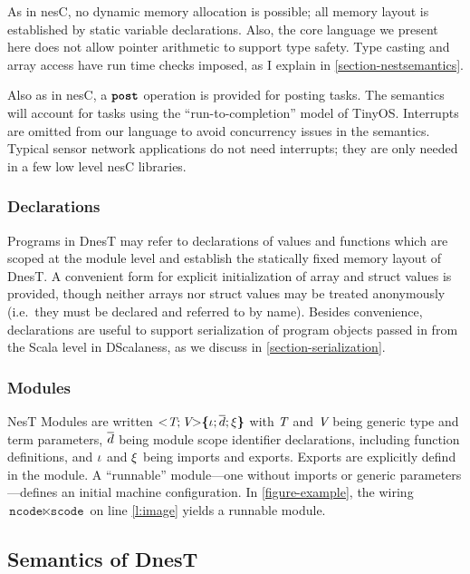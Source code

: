 As in nesC, no dynamic memory allocation is possible; all memory layout is established by static
variable declarations. Also, the core language we present here does not allow pointer arithmetic
to support type safety. Type casting and array access have run time checks imposed, as I explain
in \autoref{section-nestsemantics}.

Also as in nesC, a $\mbox{\bf \texttt{post}}$ operation is provided for posting tasks. The semantics will account
for tasks using the ``run-to-completion'' model of TinyOS. Interrupts are omitted from our
language to avoid concurrency issues in the semantics. Typical sensor network applications do
not need interrupts; they are only needed in a few low level nesC libraries.

\subsubsection{Declarations}

Programs in DnesT may refer to declarations of values and functions which are scoped at the
module level and establish the statically fixed memory layout of DnesT. A convenient form for
explicit initialization of array and struct values is provided, though neither arrays nor struct
values may be treated anonymously (i.e.~they must be declared and referred to by name). Besides
convenience, declarations are useful to support serialization of program objects passed in from
the Scala level in DScalaness, as we discuss in \autoref{section-serialization}.

\subsubsection{Modules}

NesT Modules are written $\mathrm{<}\textit{T}; \textit{V}\mathrm{>}\textup{\textbf{\{}} \iota; \overline{d}; \xi \textup{\textbf{\}}} $ with
$\textit{T}$ and $\textit{V}$ being generic type and term parameters, $\overline{d}$ being module scope
identifier declarations, including function definitions, and $\iota$ and $\xi$ being
imports and exports. Exports are explicitly defind in the module. A ``runnable'' module---one
without imports or generic parameters---defines an initial machine configuration. In
\autoref{figure-example}, the wiring $\texttt{ncode} \ltimes \texttt{scode}$ on line
\ref{l:image} yields a runnable module.

\subsection{Semantics of DnesT} 
\label{section-nestsemantics}

